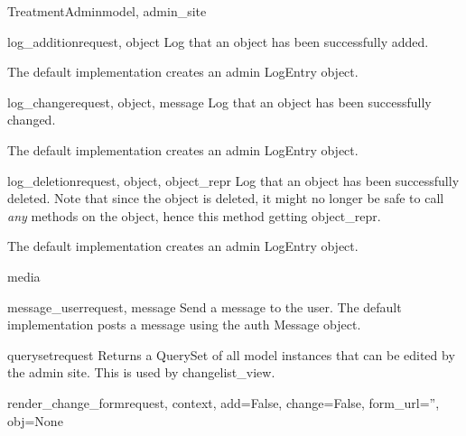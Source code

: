 \documentclass[letterpaper,10pt,english]{sphinxmanual}
\begin{document}
\begin{classdesc}{TreatmentAdmin}{model, admin\_site}
\hypertarget{data.admin.TreatmentAdmin.log_addition}{}\begin{methoddesc}{log\_addition}{request, object}
Log that an object has been successfully added.

The default implementation creates an admin LogEntry object.
\end{methoddesc}

\hypertarget{data.admin.TreatmentAdmin.log_change}{}\begin{methoddesc}{log\_change}{request, object, message}
Log that an object has been successfully changed.

The default implementation creates an admin LogEntry object.
\end{methoddesc}

\hypertarget{data.admin.TreatmentAdmin.log_deletion}{}\begin{methoddesc}{log\_deletion}{request, object, object\_repr}
Log that an object has been successfully deleted. Note that since the
object is deleted, it might no longer be safe to call \emph{any} methods
on the object, hence this method getting object\_repr.

The default implementation creates an admin LogEntry object.
\end{methoddesc}

\hypertarget{data.admin.TreatmentAdmin.media}{}\begin{memberdesc}{media}\end{memberdesc}

\hypertarget{data.admin.TreatmentAdmin.message_user}{}\begin{methoddesc}{message\_user}{request, message}
Send a message to the user. The default implementation
posts a message using the auth Message object.
\end{methoddesc}

\hypertarget{data.admin.TreatmentAdmin.queryset}{}\begin{methoddesc}{queryset}{request}
Returns a QuerySet of all model instances that can be edited by the
admin site. This is used by changelist\_view.
\end{methoddesc}

\hypertarget{data.admin.TreatmentAdmin.render_change_form}{}\begin{methoddesc}{render\_change\_form}{request, context, add=False, change=False, form\_url='', obj=None}\end{methoddesc}


\end{classdesc}
\end{document}

